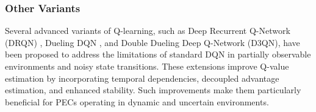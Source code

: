 \subsubsection{Other Variants}  

Several advanced variants of Q-learning, such as Deep Recurrent Q-Network (DRQN) \cite{hausknecht2015deep}, Dueling DQN \cite{wang2016dueling}, and Double Dueling Deep Q-Network (D3QN), have been proposed to address the limitations of standard DQN in partially observable environments and noisy state transitions. These extensions improve Q-value estimation by incorporating temporal dependencies, decoupled advantage estimation, and enhanced stability. Such improvements make them particularly beneficial for PECs operating in dynamic and uncertain environments.




